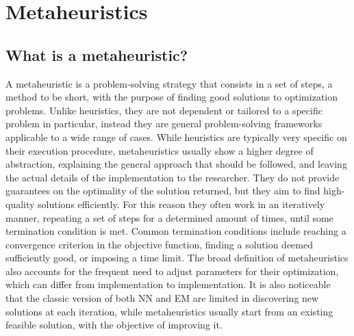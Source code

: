 \chapter{Metaheuristics}

\section{What is a metaheuristic?}
A metaheuristic is a problem-solving strategy that consists in a set of steps, a method to be short, with the purpose of finding good solutions to optimization problems.
Unlike heuristics, they are not dependent or tailored to a specific problem in particular, instead they are general problem-solving frameworks applicable to a wide range of cases.
While heuristics are typically very specific on their execution procedure, metaheuristics usually show a higher degree of abstraction, explaining the general approach that should be followed, and leaving the actual details of the implementation to the researcher.
They do not provide guarantees on the optimality of the solution returned, but they aim to find high-quality solutions efficiently.
For this reason they often work in an iteratively manner, repeating a set of steps for a determined amount of times, until some termination condition is met.
Common termination conditions include reaching a convergence criterion in the objective function, finding a solution deemed sufficiently good, or imposing a time limit.
The broad definition of metaheuristics also accounts for the frequent need to adjust parameters for their optimization, which can differ from implementation to implementation.
It is also noticeable that the classic version of both NN and EM are limited in discovering new solutions at each iteration, while metaheuristics usually start from an existing feasible solution, with the objective of improving it.

